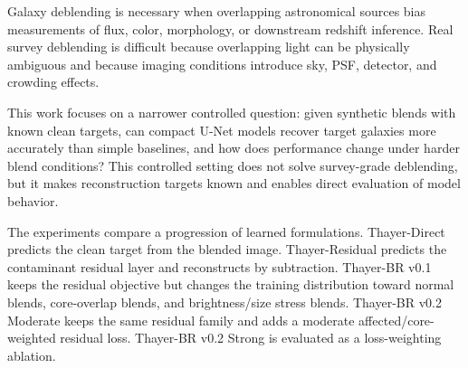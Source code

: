 Galaxy deblending is necessary when overlapping astronomical sources bias
measurements of flux, color, morphology, or downstream redshift inference. Real
survey deblending is difficult because overlapping light can be physically
ambiguous and because imaging conditions introduce sky, PSF, detector, and
crowding effects.

This work focuses on a narrower controlled question: given synthetic blends
with known clean targets, can compact U-Net models recover target galaxies more
accurately than simple baselines, and how does performance change under harder
blend conditions? This controlled setting does not solve survey-grade
deblending, but it makes reconstruction targets known and enables direct
evaluation of model behavior.

The experiments compare a progression of learned formulations. Thayer-Direct
predicts the clean target from the blended image. Thayer-Residual predicts the
contaminant residual layer and reconstructs by subtraction. Thayer-BR v0.1
keeps the residual objective but changes the training distribution toward
normal blends, core-overlap blends, and brightness/size stress blends.
Thayer-BR v0.2 Moderate keeps the same residual family and adds a moderate
affected/core-weighted residual loss. Thayer-BR v0.2 Strong is evaluated as a
loss-weighting ablation.
